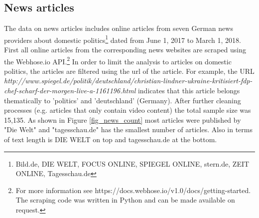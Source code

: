 \documentclass[12pt,a4paper,notitlepage]{article}
\begin{document}
\subsection{News articles}\label{ch_news}

%

The data on news articles includes online articles from seven German news providers about domestic politics\footnote{Bild.de, DIE WELT, FOCUS ONLINE, SPIEGEL ONLINE, stern.de, ZEIT ONLINE, Tagesschau.de} dated from June 1, 2017 to March 1, 2018. First all online articles from the corresponding news websites are scraped using the Webhose.io API.\footnote{For more information see https://docs.webhose.io/v1.0/docs/getting-started. The scraping code was written in Python and can be made available on request.} In order to limit the analysis to articles on domestic politics, the articles are filtered using the url of the article. For example, the URL \textit{http://www.spiegel.de/politik/deutschland/christian-lindner-ukraine-kritisiert-fdp-chef-scharf-der-morgen-live-a-1161196.html} indicates that this article belongs thematically to 'politics' and 'deutschland' (Germany). After further cleaning processes (e.g. articles that only contain video content) the total sample size was 15,135. As shown in Figure \ref{fig_news_count} most articles were published by "Die Welt" and "tagesschau.de" has the smallest number of articles. Also in terms of text length is DIE WELT on top and tagesschau.de at the bottom. 
\end{document}
